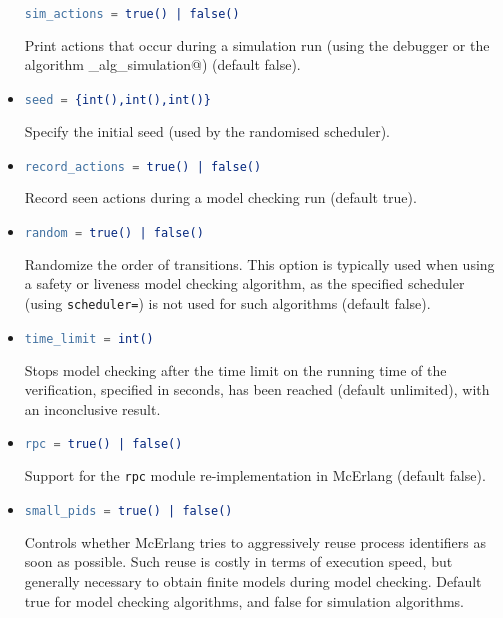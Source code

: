 \documentclass[a4paper]{article}
\begin{document}
\begin{itemize}
\begin{lstlisting}[language=Erlang]
sim_actions = true() | false()
\end{lstlisting}
Print actions that occur during a simulation run (using the debugger or
the algorithm \lstinline@mce_alg_simulation@)
(default false).
\item
\begin{lstlisting}[language=Erlang]
seed = {int(),int(),int()}
\end{lstlisting}
Specify the initial seed (used by the randomised scheduler).
\item
\begin{lstlisting}[language=Erlang]
record_actions = true() | false()
\end{lstlisting}
Record seen actions during a model checking run
(default true).
\item
\begin{lstlisting}[language=Erlang]
random = true() | false()
\end{lstlisting}
Randomize the order of transitions. This option
is typically used when 
using a safety or liveness model checking algorithm, as the specified scheduler
(using \lstinline{scheduler=}) is not used for such algorithms
(default false).
\item
\begin{lstlisting}[language=Erlang]
time_limit = int()
\end{lstlisting}
Stops model checking after the time limit on
the running time of the verification, specified in seconds,
has been reached (default unlimited), with an inconclusive result.
\item
\begin{lstlisting}[language=Erlang]
rpc = true() | false()
\end{lstlisting}
Support for the \lstinline{rpc} module re-implementation in McErlang
(default false).
\item
\begin{lstlisting}[language=Erlang]
small_pids = true() | false()
\end{lstlisting}
Controls whether McErlang tries to aggressively reuse process identifiers
as soon as possible. Such reuse is costly in terms of execution speed,
but generally necessary to obtain finite models during model checking.
Default true for model checking algorithms, and
false for simulation algorithms.
\end{itemize}
\end{document}
